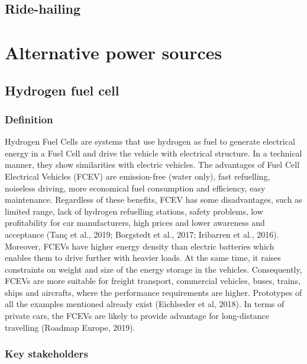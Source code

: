 \documentclass[
]{book}
\begin{document}
\hypertarget{ride-hailing}{%
\section{Ride-hailing}\label{ride-hailing}}

\hypertarget{alternative}{%
\chapter{Alternative power sources}\label{alternative}}

\hypertarget{hydrogen-fuel-cell}{%
\section{Hydrogen fuel cell}\label{hydrogen-fuel-cell}}

\hypertarget{definition-9}{%
\subsection*{Definition}\label{definition-9}}

Hydrogen Fuel Cells are systems that use hydrogen as fuel to generate electrical energy in a Fuel Cell and drive the vehicle with electrical structure. In a technical manner, they show similarities with electric vehicles. The advantages of Fuel Cell Electrical Vehicles (FCEV) are emission-free (water only), fast refuelling, noiseless driving, more economical fuel consumption and efficiency, easy maintenance. Regardless of these benefits, FCEV has some disadvantages, such as limited range, lack of hydrogen refuelling stations, safety problems, low profitability for car manufacturers, high prices and lower awareness and acceptance (Tanç et al., 2019; Borgstedt et al., 2017; Iribarren et al., 2016). Moreover, FCEVs have higher energy density than electric batteries which enables them to drive further with heavier loads. At the same time, it raises constraints on weight and size of the energy storage in the vehicles. Consequently, FCEVs are more suitable for freight transport, commercial vehicles, buses, trains, ships and aircrafts, where the performance requirements are higher. Prototypes of all the examples mentioned already exist (Eichlseder et al, 2018). In terms of private cars, the FCEVs are likely to provide advantage for long-distance travelling (Roadmap Europe, 2019).

\hypertarget{key-stakeholders-9}{%
\subsection*{Key stakeholders}\label{key-stakeholders-9}}
\end{document}
